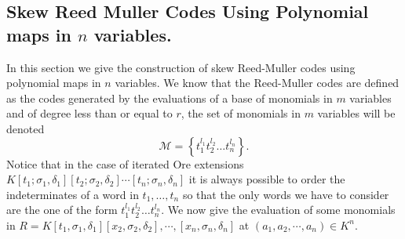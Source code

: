 \documentclass{amsproc}
\newcommand{\de}{\delta}
\newcommand{\si}{\sigma}
\numberwithin{equation}{section}
\newcommand{\mulo}{K[t_1;\si_1,\de_1][t_2;\si_2,\de_2]\cdots[t_n;\si_n,\de_n]}
\begin{document}
\subsection{Skew  Reed Muller Codes Using Polynomial maps in $n$ variables.}
In this section we give the construction of skew Reed-Muller codes using polynomial maps in $n$ variables. We know that  the Reed-Muller codes are  defined as the codes generated by the evaluations of a base of monomials in $ m $ variables and of degree less than or equal to $ r $, the set of monomials in $ m $ variables will be denoted
$$
\mathcal{M} =\left\{ t_1^{l_1}t_2^{l_2}\dots t_n^{l_n}\right\}.
$$
Notice that in the case of iterated Ore extensions $\mulo$ it is always possible to order the indeterminates of a word in $t_1,\dots, t_n$ so that  the only words we have to consider are the one of the form $t_1^{l_1}t_2^{l_2}\dots t_n^{l_n}$.
We now give the evaluation of some monomials 
in $R=K[t_1,\sigma_1,\delta_1][x_2,\sigma_2,\delta_2],\cdots,[x_n,\sigma_n,\delta_n] $ at $ (a_1,a_2,\cdots,a_n)\in K^n.$
\end{document}
